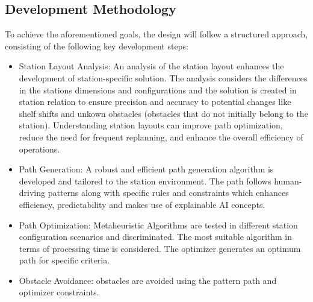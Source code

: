 \subsection{Development Methodology} %
To achieve the aforementioned goals, the design  will follow a structured approach, consisting of the following key 
development steps: 

\begin{itemize}
    \item Station Layout Analysis: An analysis of the station layout enhances the development 
    of station-specific solution. The analysis considers the differences in the stations dimensions
    and configurations and the solution is created in station relation to ensure precision and accuracy
    to potential changes like shelf shifts and unkown obstacles (obstacles that do not initially 
    belong to the station). Understanding station layouts can improve path optimization, reduce the need for 
    frequent replanning, and enhance the overall efficiency of operations.

    \item Path Generation: A robust and efficient path generation algorithm is developed and tailored to 
    the station environment. The path follows human-driving patterns along with specific rules and constraints 
    which enhances efficiency, predictability and makes use of explainable AI concepts.

    \item Path Optimization: Metaheuristic Algorithms are tested in different station configuration scenarios 
    and discriminated. The most suitable algorithm in terms of processing time is considered. The optimizer 
    generates an optimum path for specific criteria. 

    \item Obstacle Avoidance: obstacles are avoided using the pattern path and optimizer constraints.

\end{itemize}

